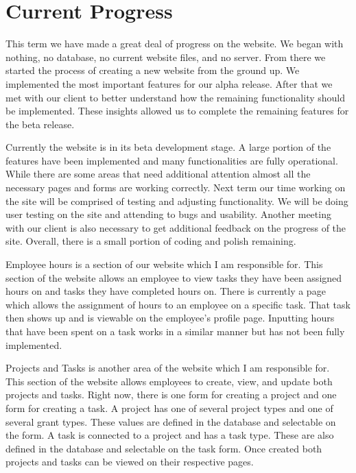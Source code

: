 \documentclass[letterpaper,10pt,titlepage,journal,compsoc,draftclsnofoot,onecolumn]{IEEEtran}
\newcommand\tab[1][1cm]{\hspace*{#1}}
\begin{document}
\section{Current Progress}

\tab
This term we have made a great deal of progress on the website. We began with nothing, no database, no current website files, and no server. From there we started the process of creating a new website from the ground up. We implemented the most important features for our alpha release. After that we met with our client to better understand how the remaining functionality should be implemented. These insights allowed us to complete the remaining features for the beta release. 
\newline

\tab
Currently the website is in its beta development stage. A large portion of the features have been implemented and many functionalities are fully operational. While there are some areas that need additional attention almost all the necessary pages and forms are working correctly. Next term our time working on the site will be comprised of testing and adjusting functionality. We will be doing user testing on the site and attending to bugs and usability. Another meeting with our client is also necessary to get additional feedback on the progress of the site. Overall, there is a small portion of coding and polish remaining.
\newline

\tab
Employee hours is a section of our website which I am responsible for. This section of the website allows an employee to view tasks they have been assigned hours on and tasks they have completed hours on. There is currently a page which allows the assignment of hours to an employee on a specific task. That task then shows up and is viewable on the employee’s profile page. Inputting hours that have been spent on a task works in a similar manner but has not been fully implemented. 
\newline

\tab
Projects and Tasks is another area of the website which I am responsible for. This section of the website allows employees to create, view, and update both projects and tasks. Right now, there is one form for creating a project and one form for creating a task. A project has one of several project types and one of several grant types. These values are defined in the database and selectable on the form. A task is connected to a project and has a task type. These are also defined in the database and selectable on the task form. Once created both projects and tasks can be viewed on their respective pages. 
\newline
\end{document}
